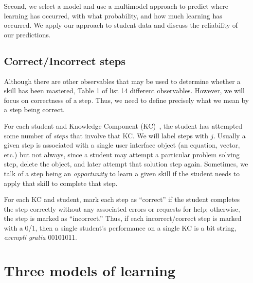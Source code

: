 \documentclass[prodmode,acmtecs]{acmsmall}
\begin{document}
Second, we select a model and use a multimodel approach
to predict where learning has occurred, with what probability,
and how much learning has occurred.  We apply our approach
to student data and discuss the reliability of our predictions.


\subsection{Correct/Incorrect steps}

Although there are other observables that may be used
to determine whether a skill has been mastered, Table 1 of
\cite{bgh} list 14 different observables.  However, we 
will focus on correctness of a step.  Thus, we need to
define precisely what we mean by a step being correct.

For each student and Knowledge Component (KC)~\cite{kc}, 
the student has attempted some number of 
{\em steps} that involve that KC.   We will label
steps with $j$.  Usually a given step is associated
with a single user interface object (an equation, vector, etc.)  but
not always, since a student may attempt a particular problem solving
step, delete the object, and later attempt that solution step again.
Sometimes, we talk of a step being an {\em opportunity} to learn
a given skill if the student needs to apply that skill
to complete that step.

%
%

For each KC and student, mark each step as ``correct'' if
the student completes the step correctly without any associated errors or 
requests for help; otherwise, the step is marked as ``incorrect.''
\label{steps} 
%
Thus, if each incorrect/correct step is marked with a 0/1, then
a single student's performance on a single KC is a bit string,
{\em exempli gratia} 00101011.

\section{Three models of learning}
\end{document}
